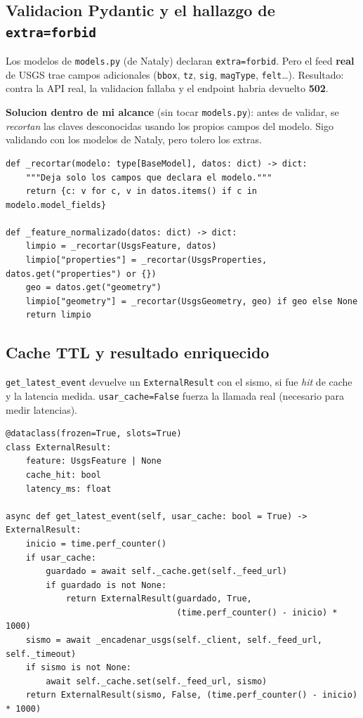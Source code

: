 \documentclass[11pt,a4paper]{article}
\newcommand{\arch}[1]{\texttt{#1}}
\newcommand{\quot}{\textquotedbl}
\begin{document}
\subsection{Validacion Pydantic y el hallazgo de \arch{extra=\quot forbid\quot}}
Los modelos de \arch{models.py} (de Nataly) declaran \arch{extra=\quot forbid\quot}.
Pero el feed \textbf{real} de USGS trae campos adicionales
(\arch{bbox}, \arch{tz}, \arch{sig}, \arch{magType}, \arch{felt}\ldots).
Resultado: contra la API real, la validacion fallaba y el endpoint habria
devuelto \textbf{502}.

\textbf{Solucion dentro de mi alcance} (sin tocar \arch{models.py}): antes de
validar, se \emph{recortan} las claves desconocidas usando los propios campos
del modelo. Sigo validando con los modelos de Nataly, pero tolero los extras.

\begin{lstlisting}[caption={Tolerancia a campos extra de USGS}]
def _recortar(modelo: type[BaseModel], datos: dict) -> dict:
    """Deja solo los campos que declara el modelo."""
    return {c: v for c, v in datos.items() if c in modelo.model_fields}

def _feature_normalizado(datos: dict) -> dict:
    limpio = _recortar(UsgsFeature, datos)
    limpio["properties"] = _recortar(UsgsProperties, datos.get("properties") or {})
    geo = datos.get("geometry")
    limpio["geometry"] = _recortar(UsgsGeometry, geo) if geo else None
    return limpio
\end{lstlisting}

\subsection{Cache TTL y resultado enriquecido}
\arch{get\_latest\_event} devuelve un \arch{ExternalResult} con el sismo, si
fue \emph{hit} de cache y la latencia medida. \arch{usar\_cache=False} fuerza
la llamada real (necesario para medir latencias).

\begin{lstlisting}[caption={Consulta con cache TTL}]
@dataclass(frozen=True, slots=True)
class ExternalResult:
    feature: UsgsFeature | None
    cache_hit: bool
    latency_ms: float

async def get_latest_event(self, usar_cache: bool = True) -> ExternalResult:
    inicio = time.perf_counter()
    if usar_cache:
        guardado = await self._cache.get(self._feed_url)
        if guardado is not None:
            return ExternalResult(guardado, True,
                                  (time.perf_counter() - inicio) * 1000)
    sismo = await _encadenar_usgs(self._client, self._feed_url, self._timeout)
    if sismo is not None:
        await self._cache.set(self._feed_url, sismo)
    return ExternalResult(sismo, False, (time.perf_counter() - inicio) * 1000)
\end{lstlisting}
\end{document}
